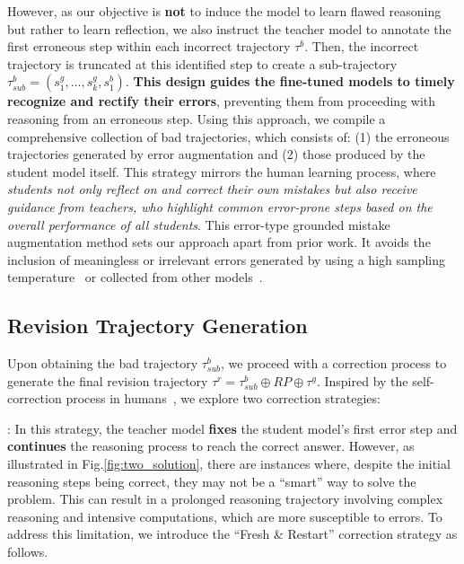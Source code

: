 \documentclass[11pt]{article}
\begin{document}
However, as our objective is \textbf{not} to induce the model to learn flawed reasoning but rather to learn reflection, we also instruct the teacher model to annotate the first erroneous step within each incorrect trajectory $\tau^{b}$. Then, the incorrect trajectory is truncated at this identified step to create a sub-trajectory $\tau^{b}_{sub} = (s^{g}_{1}, \dots, s^{g}_{k}, s^{b}_{1})$. \textbf{This design guides the fine-tuned models to timely recognize and rectify their errors}, preventing them from proceeding with reasoning from an erroneous step.
Using this approach, we compile a comprehensive collection of bad trajectories, which consists of: (1) the erroneous trajectories generated by error augmentation and (2) those produced by the student model itself.
This strategy mirrors the human learning process, where \textit{students not only reflect on and correct their own mistakes but also receive guidance from teachers, who highlight common error-prone steps based on the overall performance of all students}. This error-type grounded mistake augmentation method sets our approach apart from prior work. It avoids the inclusion of meaningless or irrelevant errors generated by using a high sampling temperature~\cite{xi2024enhancing,yan2024s,lu2024step,zhang-etal-2024-small,han2024small} or collected from other models~\cite{an2023learning}.





\subsection{Revision Trajectory Generation}
\label{sec:revision_trajectory_generation}

Upon obtaining the bad trajectory $\tau^{b}_{sub}$, we proceed with a correction process to generate the final revision trajectory $\tau^{r} = \tau^{b}_{sub} \oplus \textit{RP} \oplus \tau^{g}$. Inspired by the self-correction process in humans~\cite{hoffmann2018stimulating}, we explore two correction strategies:

: In this strategy, the teacher model \textbf{fixes} the student model's first error step and \textbf{continues} the reasoning process to reach the correct answer. 
However, as illustrated in Fig.\ref{fig:two_solution}, there are instances where, despite the initial reasoning steps being correct, they may not be a ``smart'' way to solve the problem. This can result in a prolonged reasoning trajectory involving complex reasoning and intensive computations, which are more susceptible to errors. To address this limitation, we introduce the ``Fresh \& Restart'' correction strategy as follows. 
\end{document}
